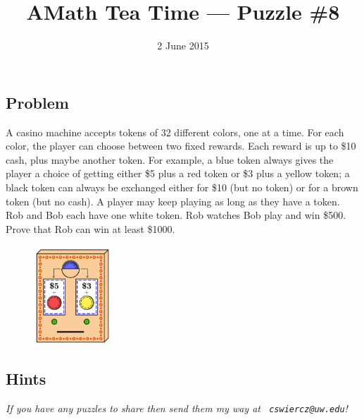 \documentclass[12pt]{article}
\title{AMath Tea Time --- Puzzle \#8}
\author{}
\date{\vspace{-1cm}2 June 2015}
\begin{document}
\maketitle
{}

\subsection*{Problem}

A casino machine accepts tokens of 32 different colors, one at a time. For each
color, the player can choose between two fixed rewards. Each reward is up to
\$10 cash, plus maybe another token. For example, a blue token always gives the
player a choice of getting either \$5 plus a red token or \$3 plus a yellow
token; a black token can always be exchanged either for \$10 (but no token) or
for a brown token (but no cash). A player may keep playing as long as they have
a token. Rob and Bob each have one white token. Rob watches Bob play and win
\$500. Prove that Rob can win at least \$1000.

\begin{figure}[ht]
  \centering
  \includegraphics[height=140px]{casino.png}
\end{figure}

\subsection*{Hints}

{
\par\vspace*{\fill}
\noindent \small \it
If you have any puzzles to share then send them my way at {\tt
  cswiercz@uw.edu}!
}
\end{document}
